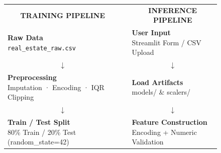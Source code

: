 \documentclass[12pt,a4paper]{article}
\begin{document}
\begin{figure}[H]
\centering
\renewcommand{\arraystretch}{1.2}
\begin{tabular}{p{6.5cm} p{0.8cm} p{6.5cm}}

\multicolumn{1}{c}{\textbf{\small TRAINING PIPELINE}} & &
\multicolumn{1}{c}{\textbf{\small INFERENCE PIPELINE}} \\[4pt]

\fcolorbox{primaryblue}{lightgray}{\parbox{6.2cm}{\centering\small\vspace{3pt}
\textbf{Raw Data}\\[1pt]{\footnotesize\texttt{real\_estate\_raw.csv}}\vspace{3pt}}}
& &
\fcolorbox{primaryblue}{lightgray}{\parbox{6.2cm}{\centering\small\vspace{3pt}
\textbf{User Input}\\[1pt]{\footnotesize Streamlit Form / CSV Upload}\vspace{3pt}}} \\[1pt]

\multicolumn{1}{c}{$\downarrow$} & & \multicolumn{1}{c}{$\downarrow$} \\[1pt]

\fcolorbox{primaryblue}{lightgray}{\parbox{6.2cm}{\centering\small\vspace{3pt}
\textbf{Preprocessing}\\[1pt]{\footnotesize Imputation · Encoding · IQR Clipping}\vspace{3pt}}}
& &
\fcolorbox{primaryblue}{lightgray}{\parbox{6.2cm}{\centering\small\vspace{3pt}
\textbf{Load Artifacts}\\[1pt]{\footnotesize models/ \& scalers/}\vspace{3pt}}} \\[1pt]

\multicolumn{1}{c}{$\downarrow$} & & \multicolumn{1}{c}{$\downarrow$} \\[1pt]

\fcolorbox{primaryblue}{lightgray}{\parbox{6.2cm}{\centering\small\vspace{3pt}
\textbf{Train / Test Split}\\[1pt]{\footnotesize 80\% Train / 20\% Test (random\_state=42)}\vspace{3pt}}}
& &
\fcolorbox{primaryblue}{lightgray}{\parbox{6.2cm}{\centering\small\vspace{3pt}
\textbf{Feature Construction}\\[1pt]{\footnotesize Encoding + Numeric Validation}\vspace{3pt}}} \\[1pt]


\end{tabular}
\end{figure}
\end{document}
